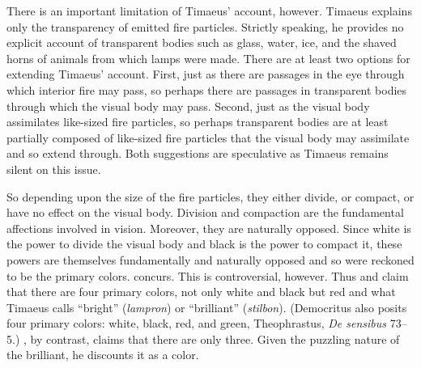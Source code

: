 There is an important limitation of Timaeus' account, however. Timaeus explains only the transparency of emitted fire particles. Strictly speaking, he provides no explicit account of transparent bodies such as glass, water, ice, and the shaved horns of animals from which lamps were made. There are at least two options for extending Timaeus' account. First, just as there are passages in the eye through which interior fire may pass, so perhaps there are passages in transparent bodies through which the visual body may pass. Second, just as the visual body assimilates like-sized fire particles, so perhaps transparent bodies are at least partially composed of like-sized fire particles that the visual body may assimilate and so extend through. Both suggestions are speculative as Timaeus remains silent on this issue.

So depending upon the size of the fire particles, they either divide, or compact, or have no effect on the visual body. Division and compaction are the fundamental affections involved in vision. Moreover, they are naturally opposed. Since white is the power to divide the visual body and black is the power to compact it, these powers are themselves fundamentally and naturally opposed and so were reckoned to be the primary colors. \citet[480--1]{Taylor:1928qb} concurs. This is controversial, however. Thus \citet{Brisson:1997qr} and \citet{Ierodiakonou:2005ly} claim that there are four primary colors, not only white and black but red and what Timaeus calls ``bright'' (\emph{lampron}) or ``brilliant'' (\emph{stilbon}). (Democritus also posits four primary colors: white, black, red, and green, Theophrastus, \emph{De sensibus} 73--5.) \citet[277]{Cornford:1935fk}, by contrast, claims that there are only three. Given the puzzling nature of the brilliant, he discounts it as a color.

